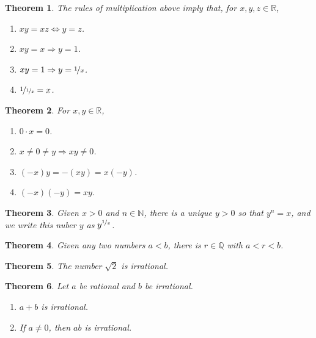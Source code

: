 \documentclass{article}
\theoremstyle{sltheorem}
\newtheorem{theorem}{Theorem}[section]
\newcommand{\R}{\mathbb{R}}
\newcommand{\N}{\mathbb{N}}
\begin{document}
\begin{theorem}
    The rules of multiplication above imply that, for $x, y, z \in \R$,
    \begin{enumerate}
        \item $xy=xz\Leftrightarrow y=z$.
        \item $xy=x\Rightarrow y=1$.
        \item $xy=1\Rightarrow y=\nicefrac{1}{x}$.
        \item $\nicefrac{1}{\nicefrac{1}{x}}=x$.
    \end{enumerate}
\end{theorem}
\begin{theorem}
    For $x,y\in\R$,
    \begin{enumerate}
        \item $0\cdot x = 0$.
        \item $x\not=0\not=y\Rightarrow xy\not=0$.
        \item $(-x)y=-(xy)=x(-y)$.
        \item $(-x)(-y)=xy$.
    \end{enumerate}
\end{theorem}
\begin{theorem}
    Given $x>0$ and $n\in\N$, there is a unique $y>0$ so that $y^n=x$, and we write this nuber $y$ as $y^{\nicefrac{1}{x}}$.
\end{theorem}
\begin{theorem}
    Given any two numbers $a<b$, there is $r\in\mathbb{Q}$ with $a<r<b$.
\end{theorem}
\begin{theorem}
    The number $\sqrt{2}$ is irrational.
\end{theorem}
\begin{theorem}
    Let $a$ be rational and $b$ be irrational.
    \begin{enumerate}
        \item $a+b$ is irrational.
        \item If $a\not=0$, then $ab$ is irrational.
    \end{enumerate}
\end{theorem}
\end{document}

